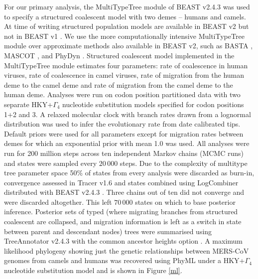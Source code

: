 \documentclass[11pt,oneside,letterpaper]{article}
\begin{document}
For our primary analysis, the MultiTypeTree module \citep{vaughan_efficient_2014} of BEAST v2.4.3 \citep{bouckaert_beast_2014} was used to specify a structured coalescent model with two demes -- humans and camels.
At time of writing structured population models are available in BEAST v2 \citep{bouckaert_beast_2014} but not in BEAST v1 \citep{drummond_bayesian_2012}.
We use the more computationally intensive MultiTypeTree module \citep{vaughan_efficient_2014} over approximate methods also available in BEAST v2, such as BASTA \citep{maio_new_2015}, MASCOT \citep{mueller_mascot:_2017}, and PhyDyn \citep{volz_complex_2011}.
Structured coalescent model implemented in the MultiTypeTree module \citep{vaughan_efficient_2014} estimates four parameters: rate of coalescence in human viruses, rate of coalescence in camel viruses, rate of migration from the human deme to the camel deme and rate of migration from the camel deme to the human deme.
Analyses were run on codon position partitioned data with two separate HKY+$\Gamma_{4}$ \citep{hky_1985,yang_1994} nucleotide substitution models specified for codon positions 1+2 and 3.
A relaxed molecular clock with branch rates drawn from a lognormal distribution \citep{drummond_2006} was used to infer the evolutionary rate from date calibrated tips.
Default priors were used for all parameters except for migration rates between demes for which an exponential prior with mean 1.0 was used.
All analyses were run for 200 million steps across ten independent Markov chains (MCMC runs) and states were sampled every $20\,000$ steps.
Due to the complexity of multitype tree parameter space 50\% of states from every analysis were discarded as burn-in, convergence assessed in Tracer v1.6 and states combined using LogCombiner distributed with BEAST v2.4.3 \citep{bouckaert_beast_2014}.
Three chains out of ten did not converge and were discarded altogether.
This left $70\,000$ states on which to base posterior inference.
Posterior sets of typed (where migrating branches from structured coalescent are collapsed, and migration information is left as a switch in state between parent and descendant nodes) trees were summarised using TreeAnnotator v2.4.3 with the common ancestor heights option \citep{heled_looking_2013}.
A maximum likelihood phylogeny showing just the genetic relationships between MERS-CoV genomes from camels and humans was recovered using PhyML \citep{guindon_simple_2003} under a HKY+$\Gamma_{4}$ \citep{hky_1985,yang_1994} nucleotide substitution model and is shown in Figure \ref{ml}.
\end{document}

